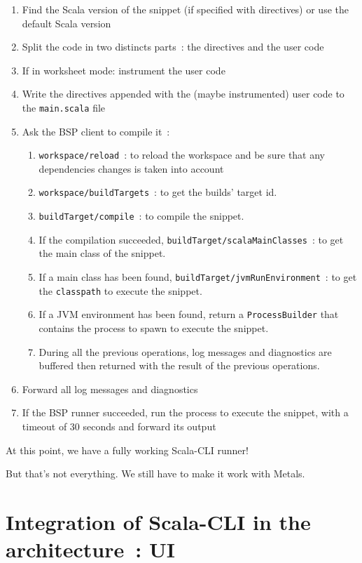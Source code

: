 \documentclass{article}
\begin{document}
\begin{enumerate}
    \item Find the Scala version of the snippet (if specified with directives) or use the default Scala version
    \item Split the code in two distincts parts~: the directives and the user code
    \item If in worksheet mode: instrument the user code
    \item Write the directives appended with the (maybe instrumented) user code to the \lstinline{main.scala} file
    \item Ask the BSP client to compile it~:
    \begin{enumerate}
        \item \lstinline{workspace/reload}~: to reload the workspace and be sure that any dependencies changes is taken into account
        \item \lstinline{workspace/buildTargets}~: to get the builds' target id.
        \item \lstinline{buildTarget/compile}~: to compile the snippet.
        \item If the compilation succeeded, \lstinline{buildTarget/scalaMainClasses}~: to get the main class of the snippet.
        \item If a main class has been found, \lstinline{buildTarget/jvmRunEnvironment}~: to get the \lstinline{classpath} to execute the snippet.
        \item If a JVM environment has been found, return a \lstinline{ProcessBuilder} that contains the process to spawn to execute the snippet.
        \item During all the previous operations, log messages and diagnostics are buffered then returned with the result of the previous operations.
    \end{enumerate}
    \item Forward all log messages and diagnostics
    \item If the BSP runner succeeded, run the process to execute the snippet, with a timeout of 30 seconds and forward its output
\end{enumerate}

At this point, we have a fully working Scala-CLI runner!

But that's not everything. We still have to make it work with Metals.

\section{Integration of Scala-CLI in the architecture~: UI}
\end{document}
